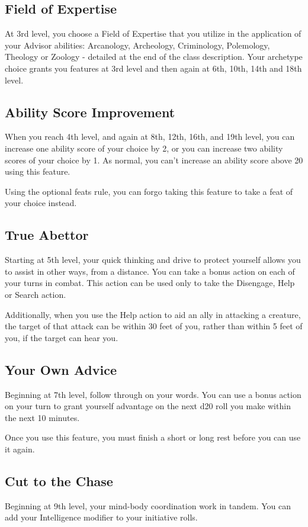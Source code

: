 \documentclass[letterpaper,openany,twoside,twocolumn]{book}
\begin{document}
	\subsection*{Field of Expertise}
	At 3rd level, you choose a Field of Expertise that you utilize in the application of your Advisor abilities: Arcanology, Archeology, Criminology, Polemology, Theology or Zoology - detailed at the end of the class description. Your archetype choice grants you features at 3rd level and then again at 6th, 10th, 14th and 18th level.
	
	\subsection*{Ability Score Improvement}
	When you reach 4th level, and again at 8th, 12th, 16th, and 19th level, you can increase one ability score of your choice by 2, or you can increase two ability scores of your choice by 1. As normal, you can’t increase an ability score above 20 using this feature.
	
	Using the optional feats rule, you can forgo taking this feature to take a feat of your choice instead.
	
	\subsection*{True Abettor}
	Starting at 5th level, your quick thinking and drive to protect yourself allows you to assist in other ways, from a distance. You can take a bonus action on each of your turns in combat. This action can be used only to take the Disengage, Help or Search action.
	
	Additionally, when you use the Help action to aid an ally in attacking a creature, the target of that attack can be within 30 feet of you, rather than within 5 feet of you, if the target can hear you.
	
	\subsection*{Your Own Advice}
	Beginning at 7th level, follow through on your words. You can use a bonus action on your turn to grant yourself advantage on the next d20 roll you make within the next 10 minutes.
	
	Once you use this feature, you must finish a short or long rest before you can use it again.
	
	\subsection*{Cut to the Chase}
	Beginning at 9th level, your mind-body coordination work in tandem. You can add your Intelligence modifier to your initiative rolls.
	
\end{document}
